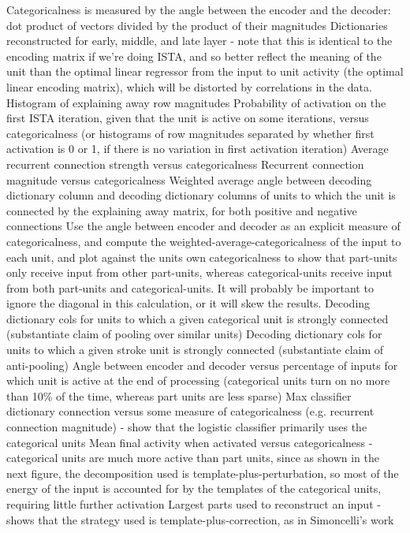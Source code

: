 Categoricalness is measured by the angle between the encoder and the decoder: dot product of vectors divided by the product of their magnitudes
Dictionaries reconstructed for early, middle, and late layer - note that this is identical to the encoding matrix if we're doing ISTA, and so better reflect the meaning of the unit than the optimal linear regressor from the input to unit activity (the optimal linear encoding matrix), which will be distorted by correlations in the data.
Histogram of explaining away row magnitudes
Probability of activation on the first ISTA iteration, given that the unit is active on some iterations, versus categoricalness (or histograms of row magnitudes separated by whether first activation is 0 or 1, if there is no variation in first activation iteration)
Average recurrent connection strength versus categoricalness
Recurrent connection magnitude versus categoricalness
Weighted average angle between decoding dictionary column and decoding dictionary columns of units to which the unit is connected by the explaining away matrix, for both positive and negative connections
Use the angle between encoder and decoder as an explicit measure of categoricalness, and compute the weighted-average-categoricalness of the input to each unit, and plot against the units own categoricalness to show that part-units only receive input from other part-units, whereas categorical-units receive input from both part-units and categorical-units.  It will probably be important to ignore the diagonal in this calculation, or it will skew the results.
Decoding dictionary cols for units to which a given categorical unit is strongly connected (substantiate claim of pooling over similar units)
Decoding dictionary cols for units to which a given stroke unit is strongly connected (substantiate claim of anti-pooling)
Angle between encoder and decoder versus percentage of inputs for which unit is active at the end of processing (categorical units turn on no more than 10\% of the time, whereas part units are less sparse)
Max classifier dictionary connection versus some measure of categoricalness (e.g. recurrent connection magnitude) - show that the logistic classifier primarily uses the categorical units
Mean final activity when activated versus categoricalness - categorical units are much more active than part units, since as shown in the next figure, the decomposition used is template-plus-perturbation, so most of the energy of the input is accounted for by the templates of the categorical units, requiring little further activation
Largest parts used to reconstruct an input - shows that the strategy used is template-plus-correction, as in Simoncelli's work



